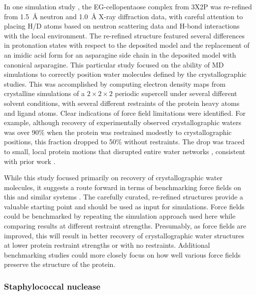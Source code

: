 \documentclass[9pt,review,pubversion]{livecoms}
\begin{document}
In one simulation study \cite{wall_biomolecular_2019}, the EG-cellopentaose complex from 3X2P was re-refined from \qty{1.5}{\angstrom} neutron and \qty{1.0}{\angstrom} X-ray diffraction data, with careful attention to placing H/D atoms based on neutron scattering data and H-bond interactions with the local environment.
The re-refined structure featured several differences in protonation states with respect to the deposited model and the replacement of an imidic acid form for an asparagine side chain in the deposited model with canonical asparagine.
This particular study focused on the ability of MD simulations to correctly position water molecules defined by the crystallographic studies.
This was accomplished by computing electron density maps from crystalline simulations of a $2 \times 2 \times 2$ periodic supercell under several different solvent conditions, with several different restraints of the protein heavy atoms and ligand atoms.
Clear indications of force field limitations were identified.
For example, although recovery of experimentally observed crystallographic waters was over 90\% when the protein was restrained modestly to crystallographic positions, this fraction dropped to 50\% without restraints.
The drop was traced to small, local protein motions that disrupted entire water networks \cite{wall_biomolecular_2019}, consistent with prior work \cite{lexa_full_2011}.

While this study focused primarily on recovery of crystallographic water molecules, it suggests a route forward in terms of benchmarking force fields on this and similar systems \cite{wall_biomolecular_2019}.
The carefully curated, re-refined structures provide a valuable starting point and should be used as input for simulations.
Force fields could be benchmarked by repeating the simulation approach used here while comparing results at different restraint strengths.
Presumably, as force fields are improved, this will result in better recovery of crystallographic water structures at lower protein restraint strengths or with no restraints.
Additional benchmarking studies could more closely focus on how well various force fields preserve the structure of the protein.

\subsubsection{Staphylococcal nuclease}
\label{sub2:staph_nuclease}
\end{document}
